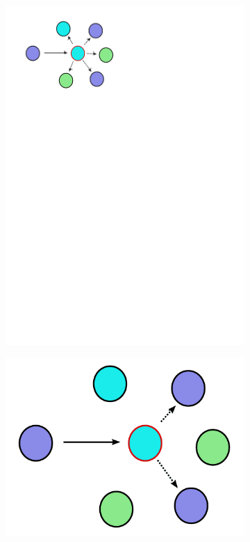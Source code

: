\documentclass[12pt,a4paper]{article}
\begin{document}
\begin{figure}
	\begin{center}
        \begin{subfigure}[b]{0.4\textwidth}
		  \includegraphics[width=\textwidth]{upstream.pdf}
            \caption{}\label{upstream}
        \end{subfigure}
        \qquad
        \begin{subfigure}[b]{0.4\textwidth}
		  \includegraphics[width=\textwidth]{group.pdf}

\end{subfigure}
\end{center}
\end{figure}
\end{document}
